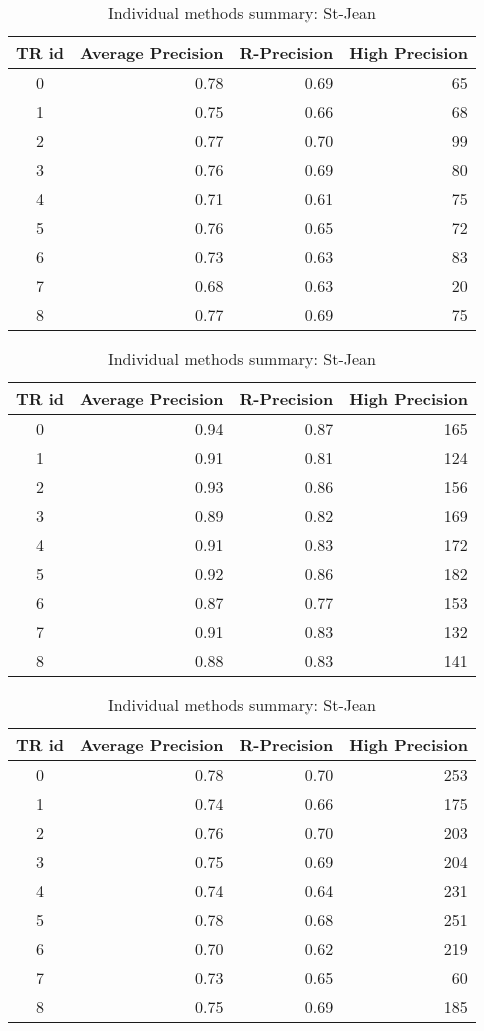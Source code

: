 \begin{table}[H]
  \centering
  \caption{Individual methods summary: St-Jean}
  \label{tab:rls_st_jean}

  \begin{tabular}{c r r r}
    \toprule
    TR id &
    Average Precision &
    R-Precision &
    High Precision \\
    \midrule
    0 & 0.78 & 0.69 & 65 \\
    1 & 0.75 & 0.66 & 68 \\
    2 & 0.77 & 0.70 & 99 \\
    3 & 0.76 & 0.69 & 80 \\
    4 & 0.71 & 0.61 & 75 \\
    5 & 0.76 & 0.65 & 72 \\
    6 & 0.73 & 0.63 & 83 \\
    7 & 0.68 & 0.63 & 20 \\
    8 & 0.77 & 0.69 & 75 \\
    \bottomrule
  \end{tabular}

  \vspace{0.5cm}

  \begin{tabular}{c r r r}
    \toprule
    TR id &
    Average Precision &
    R-Precision &
    High Precision \\
    \midrule
    0 & 0.94 & 0.87 & 165 \\
    1 & 0.91 & 0.81 & 124 \\
    2 & 0.93 & 0.86 & 156 \\
    3 & 0.89 & 0.82 & 169 \\
    4 & 0.91 & 0.83 & 172 \\
    5 & 0.92 & 0.86 & 182 \\
    6 & 0.87 & 0.77 & 153 \\
    7 & 0.91 & 0.83 & 132 \\
    8 & 0.88 & 0.83 & 141 \\
    \bottomrule
  \end{tabular}

  \vspace{0.5cm}

  \begin{tabular}{c r r r}
    \toprule
    TR id &
    Average Precision &
    R-Precision &
    High Precision \\
    \midrule
    0 & 0.78 & 0.70 & 253 \\
    1 & 0.74 & 0.66 & 175 \\
    2 & 0.76 & 0.70 & 203 \\
    3 & 0.75 & 0.69 & 204 \\
    4 & 0.74 & 0.64 & 231 \\
    5 & 0.78 & 0.68 & 251 \\
    6 & 0.70 & 0.62 & 219 \\
    7 & 0.73 & 0.65 &  60 \\
    8 & 0.75 & 0.69 & 185 \\
    \bottomrule
  \end{tabular}
\end{table}
